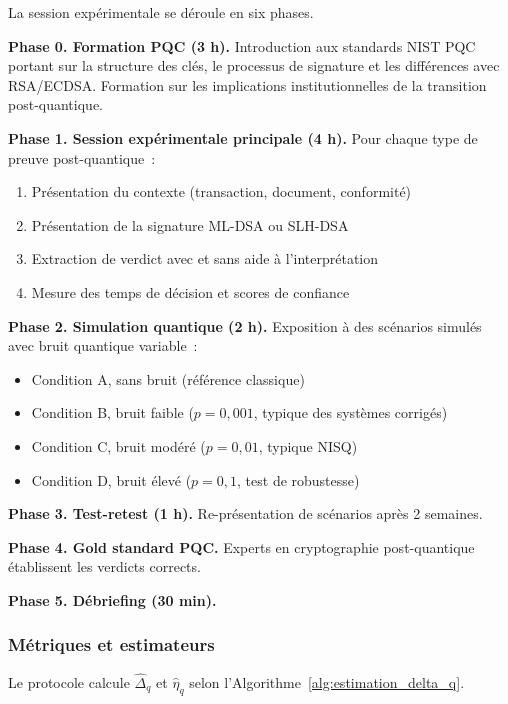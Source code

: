 \begin{sloppypar}
La session exp\'erimentale se d\'eroule en six phases.

\noindent\textbf{Phase 0. Formation PQC (3 h).}
Introduction aux standards NIST PQC portant sur la structure des cl\'es, le processus de
signature et les diff\'erences avec RSA/ECDSA. Formation sur les implications
institutionnelles de la transition post-quantique.

\noindent\textbf{Phase 1. Session exp\'erimentale principale (4 h).}
Pour chaque type de preuve post-quantique~:
\begin{enumerate}
\item[(a)] Pr\'esentation du contexte (transaction, document, conformit\'e)
\item[(b)] Pr\'esentation de la signature ML-DSA ou SLH-DSA
\item[(c)] Extraction de verdict avec et sans aide \`a l'interpr\'etation
\item[(d)] Mesure des temps de d\'ecision et scores de confiance
\end{enumerate}

\noindent\textbf{Phase 2. Simulation quantique (2 h).}
Exposition \`a des sc\'enarios simul\'es avec bruit quantique variable~:
\begin{itemize}
\item Condition A, sans bruit (r\'ef\'erence classique)
\item Condition B, bruit faible ($p = 0{,}001$, typique des syst\`emes corrig\'es)
\item Condition C, bruit mod\'er\'e ($p = 0{,}01$, typique NISQ)
\item Condition D, bruit \'elev\'e ($p = 0{,}1$, test de robustesse)
\end{itemize}

\noindent\textbf{Phase 3. Test-retest (1 h).}
Re-pr\'esentation de sc\'enarios apr\`es 2 semaines.

\noindent\textbf{Phase 4. Gold standard PQC.}
Experts en cryptographie post-quantique \'etablissent les verdicts corrects.

\noindent\textbf{Phase 5. D\'ebriefing (30 min).}

\subsubsection{M\'etriques et estimateurs}
\label{subsubsec:metriques_delta_q}

Le protocole calcule $\hat\Delta_q$ et $\hat\eta_q$ selon
l'Algorithme~\ref{alg:estimation_delta_q}.


\end{sloppypar}
